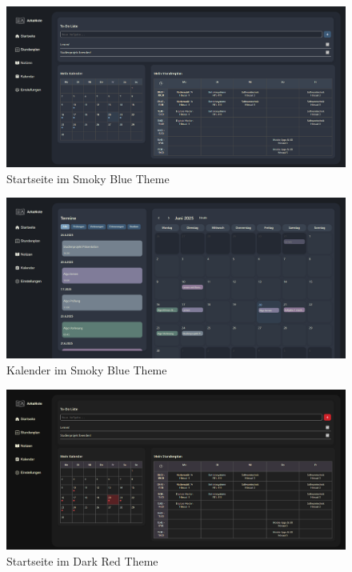 \begin{figure}[H]
  \centering
  \includegraphics[width=1\textwidth]{./images/startseite-blue.png}
  \caption{Startseite im Smoky Blue Theme}
  \label{fig:startseite-blue}
\end{figure}

\begin{figure}[H]
  \centering
  \includegraphics[width=1\textwidth]{./images/kalender-blue.png}
  \caption{Kalender im Smoky Blue Theme}
  \label{fig:kalender-blue}
\end{figure}

\begin{figure}[H]
  \centering
  \includegraphics[width=1\textwidth]{./images/startseite-red.png}
  \caption{Startseite im Dark Red Theme}
  \label{fig:startseite-red}
\end{figure}

